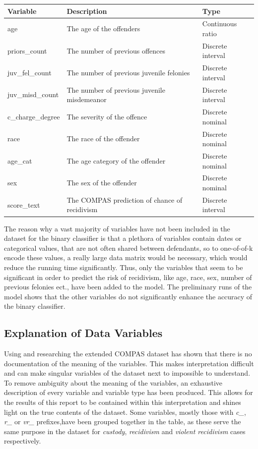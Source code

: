 \documentclass[11pt, fleqn, titlepage]{article}
\begin{document}
	
	\begin{table}[H]\label{resultater}
		\centering
		\begin{tabular}{l l l}
			Variable & Description & Type \\ \hline
			age & The age of the offenders & Continuous ratio \\
			priors\_count & The number of previous offences & Discrete interval \\
			juv\_fel\_count & The number of previous juvenile felonies & Discrete interval \\
			juv\_misd\_count & The number of previous juvenile misdemeanor & Discrete interval \\
			c\_charge\_degree & The severity of the offence & Discrete nominal \\
			race & The race of the offender & Discrete nominal \\
			age\_cat & The age category of the offender & Discrete nominal \\
			sex & The sex of the offender & Discrete nominal \\
			score\_text & The COMPAS prediction of chance of recidivism & Discrete interval
		\end{tabular}
	\end{table} \noindent
	The reason why a vast majority of variables have not been included in the dataset for the binary classifier is that a plethora of variables contain dates or categorical values, that are not often shared between defendants, so to one-of-of-k encode these values, a really large data matrix would be necessary, which would reduce the running time significantly. Thus, only the variables that seem to be significant in order to predict the risk of recidivism, like age, race, sex, number of previous felonies ect., have been added to the model. The preliminary runs of the model shows that the other variables do not significantly enhance the accuracy of the binary classifier.
		
		
	\subsection{Explanation of Data Variables} \label{dataExamination}
	Using and researching the extended COMPAS dataset has shown that there is no documentation of the meaning of the variables. This makes interpretation difficult and can make singular variables of the dataset next to impossible to understand. To remove ambiguity about the meaning of the variables, an exhaustive description of every variable and variable type has been produced. This allows for the results of this report to be contained within this interpretation and shines light on the true contents of the dataset. Some variables, mostly those with \textit{c\_}, \textit{r\_} or \textit{vr\_} prefixes,have been grouped together in the table, as these serve the same purpose in the dataset for \textit{custody}, \textit{recidivism} and \textit{violent recidivism} cases respectively. 
	
\end{document}
